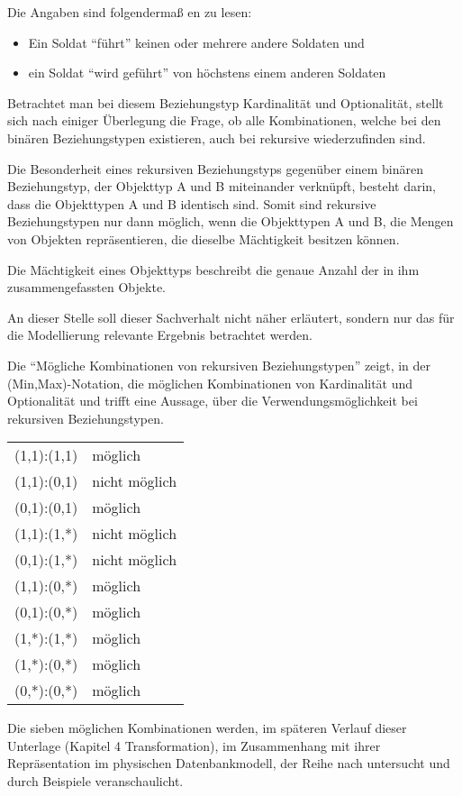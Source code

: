 Die Angaben sind folgendermaß en zu lesen:
\begin{itemize}
    \item Ein Soldat \enquote{führt} keinen oder mehrere andere Soldaten und
    \item ein Soldat \enquote{wird geführt} von höchstens einem anderen Soldaten
\end{itemize}
Betrachtet man bei diesem Beziehungstyp Kardinalität und Optionalität, stellt sich nach einiger Überlegung die Frage, ob alle Kombinationen, welche bei den binären Beziehungstypen existieren, auch bei rekursive wiederzufinden sind.

Die Besonderheit eines rekursiven Beziehungstyps gegenüber einem binären Beziehungstyp, der Objekttyp A und B miteinander verknüpft, besteht darin, dass die Objekttypen A und B identisch sind. Somit sind rekursive Beziehungstypen nur dann möglich, wenn die Objekttypen A und B, die Mengen von Objekten repräsentieren, die dieselbe Mächtigkeit besitzen können.
\begin{merke}
    Die Mächtigkeit eines Objekttyps beschreibt die genaue Anzahl der in ihm zusammengefassten Objekte.
\end{merke}
An dieser Stelle soll dieser Sachverhalt nicht näher erläutert, sondern nur das für die Modellierung relevante Ergebnis betrachtet werden.

Die  \enquote{Mögliche Kombinationen von rekursiven Beziehungstypen} zeigt, in der\\ (Min,Max)-Notation, die möglichen Kombinationen von Kardinalität und Optionalität und trifft eine Aussage, über die Verwendungsmöglichkeit bei rekursiven Beziehungstypen.
\begin{center}
\label{combinationsrecurisverelationtyps}
\begin{supertabular}[h]{lp{5cm}}
    (1,1):(1,1) & möglich\\
    (1,1):(0,1) & nicht möglich\\
    (0,1):(0,1) & möglich\\
    (1,1):(1,*) & nicht möglich\\
    (0,1):(1,*) & nicht möglich\\
    (1,1):(0,*) & möglich\\
    (0,1):(0,*) & möglich\\
    (1,*):(1,*) & möglich\\
    (1,*):(0,*) & möglich\\
    (0,*):(0,*) & möglich\\
\end{supertabular}
\end{center}
Die sieben möglichen Kombinationen werden, im späteren Verlauf
dieser Unterlage (Kapitel 4 Transformation), im Zusammenhang mit ihrer
Repräsentation im physischen Datenbankmodell, der Reihe nach
untersucht und durch Beispiele veranschaulicht.
